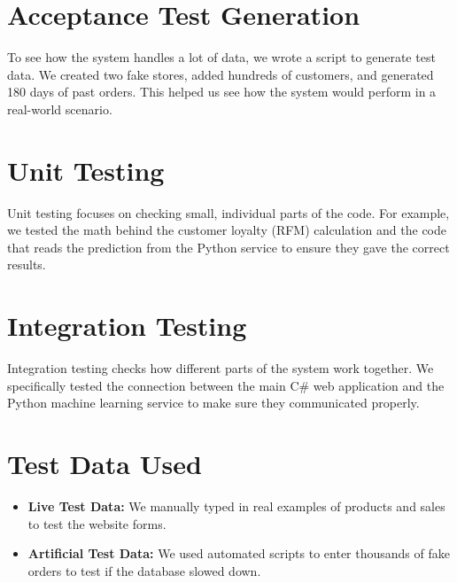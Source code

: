 \documentclass[12pt,a4paper]{report}
\begin{document}
\section{Acceptance Test Generation}
To see how the system handles a lot of data, we wrote a script to generate test data. We created two fake stores, added hundreds of customers, and generated 180 days of past orders. This helped us see how the system would perform in a real-world scenario.

\section{Unit Testing}
Unit testing focuses on checking small, individual parts of the code. For example, we tested the math behind the customer loyalty (RFM) calculation and the code that reads the prediction from the Python service to ensure they gave the correct results.

\section{Integration Testing}
Integration testing checks how different parts of the system work together. We specifically tested the connection between the main C\# web application and the Python machine learning service to make sure they communicated properly.

\section{Test Data Used}
\begin{itemize}
    \item \textbf{Live Test Data:} We manually typed in real examples of products and sales to test the website forms.
    \item \textbf{Artificial Test Data:} We used automated scripts to enter thousands of fake orders to test if the database slowed down.
\end{itemize}
\end{document}
